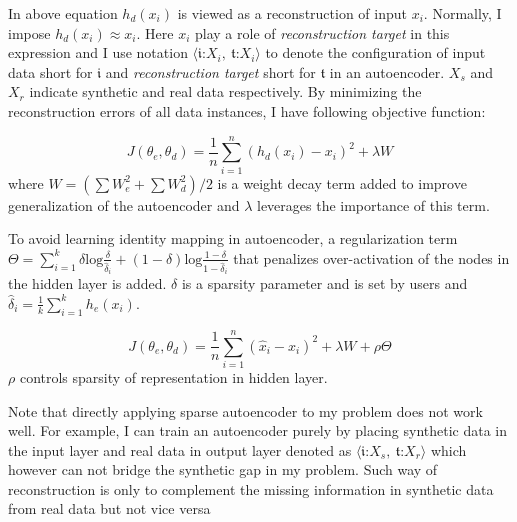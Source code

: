 \documentclass{iitthesis}
\begin{document}
In above equation $h_{d}(x_{i})$ is viewed as a reconstruction of input $x_{i}$. Normally, I impose $h_{d}(x_{i})\approx x_{i}$. Here $x_{i}$ play a role of \textit{reconstruction target} in this
expression and I use notation $\langle\mathfrak{i}\text{:}X_{i},\:\mathfrak{t}\text{:}X_{i}\rangle$ to denote the configuration of input data short for $\mathfrak{i}$ and \textit{reconstruction target} short for $\mathfrak{t}$ in an autoencoder. $X_{s}$ and $X_{r}$ indicate synthetic and real data respectively. By minimizing the reconstruction errors of all data instances, I have following objective function:

\begin{equation}
J(\theta_{e},\theta_{d})=\frac{1}{n}\sum_{i=1}^{n}(h_{d}(x_{i})-x_{i})^{2}+\lambda W\label{eq:reconstruction_error_basic}
\end{equation}
where $W=({\sum W_{e}^{2}+\sum W_{d}^{2}})/2$ is a weight decay term
added to improve generalization of the autoencoder and $\lambda$
leverages the importance of this term.

To avoid learning identity mapping in autoencoder, a regularization
term $\Theta=\sum_{i=1}^{k}{\delta\text{log}\frac{\delta}{\hat{\delta}_{i}}+(1-\delta)\text{log}\frac{1-\delta}{1-\hat{\delta}_{i}}}$ that penalizes over-activation of the nodes in the hidden layer is
added. $\delta$ is a sparsity parameter and is set by users and $\hat{\delta}_{i}=\frac{1}{k}\sum_{i=1}^{k}h_{e}(x_{i})$.

\begin{equation}
J(\theta_{e},\theta_{d})=\frac{1}{n}\sum_{i=1}^{n}(\hat{x}_{i}-x_{i})^{2}+\lambda W+\rho\Theta\label{Equ: SparsityObjective}
\end{equation}
$\rho$ controls sparsity of representation in hidden layer.



Note that directly applying sparse autoencoder to my problem does not work well. For example, I can train an autoencoder purely by placing synthetic data in the input layer and real data in output layer denoted as $\langle\mathfrak{i}\text{:}X_{s},\:\mathfrak{t}\text{:}X_{r}\rangle$ which however can not bridge the synthetic gap in my problem. Such way of reconstruction is only to complement the missing information in synthetic data from real data but not vice versa
\end{document}
